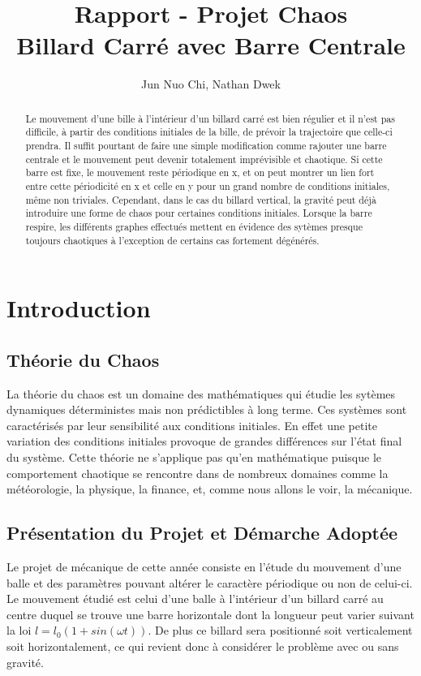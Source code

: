 \documentclass[a4paper]{report}
\title{Rapport - Projet Chaos\\Billard Carré avec Barre Centrale}
\author{Jun Nuo Chi, Nathan Dwek}
\begin{document}
\maketitle

\tableofcontents

\begin{abstract}

Le mouvement d'une bille à l'intérieur d'un billard carré est bien régulier et il n'est pas difficile, à partir des conditions initiales de la bille, de prévoir la trajectoire que celle-ci prendra. Il suffit pourtant de faire une simple modification comme rajouter une barre centrale et le mouvement peut devenir totalement imprévisible et chaotique.
Si cette barre est fixe, le mouvement reste périodique en x, et on peut montrer un lien fort entre cette périodicité en x et celle en y pour un grand nombre de conditions initiales, même non triviales. Cependant, dans le cas du billard vertical, la gravité peut déjà introduire une forme de chaos pour certaines conditions initiales. Lorsque la barre respire, les différents graphes effectués mettent en évidence des sytèmes presque toujours chaotiques à l'exception de certains cas fortement dégénérés.

\end{abstract}

\chapter{Introduction}

\section{Théorie du Chaos}
La théorie du chaos est un domaine des mathématiques qui étudie les sytèmes dynamiques déterministes mais non prédictibles à long terme. Ces systèmes sont caractérisés par leur sensibilité aux conditions initiales. En effet une petite variation des conditions initiales provoque de grandes différences sur l'état final du système. Cette théorie ne s'applique pas qu'en mathématique puisque le comportement chaotique se rencontre dans de nombreux domaines comme la météorologie, la physique, la finance, et, comme nous allons le voir, la mécanique.

\section{Présentation du Projet et Démarche Adoptée}
Le projet de mécanique de cette année consiste en l'étude du mouvement d'une balle et des paramètres pouvant altérer le caractère périodique ou non de celui-ci. Le mouvement étudié est celui d'une balle à l'intérieur d'un billard carré au centre duquel se  trouve une barre horizontale dont la longueur peut varier suivant la loi \(l=l_0(1+sin(\omega t)) \). De plus ce billard sera positionné soit verticalement soit horizontalement, ce qui revient donc à considérer le problème avec ou sans gravité.
\end{document}
